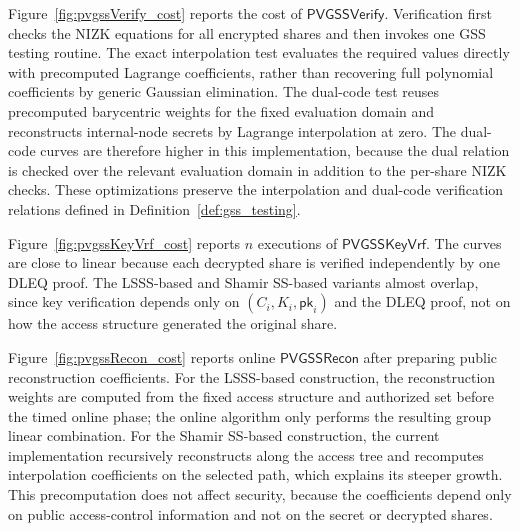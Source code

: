 \documentclass[runningheads]{llncs}
\newcommand{\pvgssVerify}{\mathsf{PVGSSVerify}}
\newcommand{\pvgssKeyVrf}{\mathsf{PVGSSKeyVrf}}
\newcommand{\pvgssRecon}{\mathsf{PVGSSRecon}}
\begin{document}
Figure~\ref{fig:pvgssVerify_cost} reports the cost of $\pvgssVerify$. Verification first checks the NIZK equations for all encrypted shares and then invokes one GSS testing routine. The exact interpolation test evaluates the required values directly with precomputed Lagrange coefficients, rather than recovering full polynomial coefficients by generic Gaussian elimination. The dual-code test reuses precomputed barycentric weights for the fixed evaluation domain and reconstructs internal-node secrets by Lagrange interpolation at zero. The dual-code curves are therefore higher in this implementation, because the dual relation is checked over the relevant evaluation domain in addition to the per-share NIZK checks. These optimizations preserve the interpolation and dual-code verification relations defined in Definition~\ref{def:gss_testing}.

Figure~\ref{fig:pvgssKeyVrf_cost} reports $n$ executions of $\pvgssKeyVrf$. The curves are close to linear because each decrypted share is verified independently by one DLEQ proof. The LSSS-based and Shamir SS-based variants almost overlap, since key verification depends only on $(C_i,K_i,\mathsf{pk}_i)$ and the DLEQ proof, not on how the access structure generated the original share.

Figure~\ref{fig:pvgssRecon_cost} reports online $\pvgssRecon$ after preparing public reconstruction coefficients. For the LSSS-based construction, the reconstruction weights are computed from the fixed access structure and authorized set before the timed online phase; the online algorithm only performs the resulting group linear combination. For the Shamir SS-based construction, the current implementation recursively reconstructs along the access tree and recomputes interpolation coefficients on the selected path, which explains its steeper growth. This precomputation does not affect security, because the coefficients depend only on public access-control information and not on the secret or decrypted shares.
\end{document}
